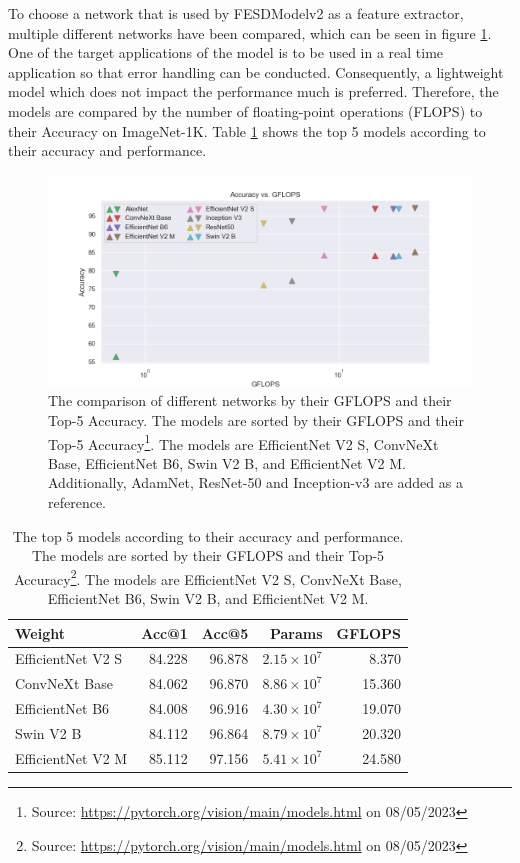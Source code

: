 To choose a network that is used by FESDModelv2 as a feature extractor, multiple different networks have been compared, which can be seen in figure \ref{fig:network_comparison}. One of the target applications of the model is to be used in a real time application so that error handling can be conducted. Consequently, a lightweight model which does not impact the performance much is preferred. Therefore, the models are compared by the number of floating-point operations (FLOPS) to their Accuracy on ImageNet-1K. Table \ref{tab:network_comparison} shows the top 5 models according to their accuracy and performance. 

\begin{figure}
  \centering
  \includegraphics[width=\linewidth]{figures/network/networks.png}
  \caption[Network comparison]{The comparison of different networks by their GFLOPS and their Top-5 Accuracy. The models are sorted by their GFLOPS and their Top-5 Accuracy\footnote{Source: \url{https://pytorch.org/vision/main/models.html} on 08/05/2023}. The models are EfficientNet V2 S, ConvNeXt Base, EfficientNet B6, Swin V2 B, and EfficientNet V2 M. Additionally, AdamNet, ResNet-50 and Inception-v3 are added as a reference.}
  \label{fig:network_comparison}
\end{figure}

\begin{table}[]
  \caption[Top 5 models for Accuracy and Performance]{The top 5 models according to their accuracy and performance. The models are sorted by their GFLOPS and their Top-5 Accuracy\footnote{Source: \url{https://pytorch.org/vision/main/models.html} on 08/05/2023}. The models are EfficientNet V2 S, ConvNeXt Base, EfficientNet B6, Swin V2 B, and EfficientNet V2 M.}
  \label{tab:network_comparison}
  \begin{tabular}{lrrrr}
    \hline
            Weight &  Acc@1 &  Acc@5 &   Params &  GFLOPS \\
    \hline
  EfficientNet V2 S & 84.228 & 96.878 & $2.15 \times 10^7$ &   8.370 \\
      ConvNeXt Base & 84.062 & 96.870 & $8.86 \times 10^7$ &  15.360 \\
    EfficientNet B6 & 84.008 & 96.916 & $4.30 \times 10^7$ &  19.070 \\
          Swin V2 B & 84.112 & 96.864 & $8.79 \times 10^7$ &  20.320 \\
  EfficientNet V2 M & 85.112 & 97.156 & $5.41 \times 10^7$ &  24.580 \\
  \hline
  \end{tabular}
\end{table}

